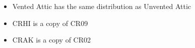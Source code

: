 \begin{itemize}
\item Vented Attic has the same distribution as Unvented Attic
\item CRHI is a copy of CR09
\item CRAK is a copy of CR02
\end{itemize}
